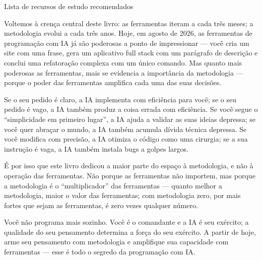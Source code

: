 \begin{center}\small\color{gray}Lista de recursos de estudo recomendados\end{center}


Voltemos à crença central deste livro: as ferramentas iteram a cada três meses; a metodologia evolui a cada três anos. Hoje, em agosto de 2026, as ferramentas de programação com IA já são poderosas a ponto de impressionar — você cria um site com uma frase, gera um aplicativo full stack com um parágrafo de descrição e conclui uma refatoração complexa com um único comando. Mas quanto mais poderosas as ferramentas, mais se evidencia a importância da metodologia — porque o poder das ferramentas amplifica cada uma das suas decisões.

Se o seu pedido é claro, a IA implementa com eficiência para você; se o seu pedido é vago, a IA também produz a coisa errada com eficiência. Se você segue o “simplicidade em primeiro lugar”, a IA ajuda a validar as suas ideias depressa; se você quer abraçar o mundo, a IA também acumula dívida técnica depressa. Se você modifica com precisão, a IA otimiza o código como uma cirurgia; se a sua instrução é vaga, a IA também instala bugs a golpes largos.

É por isso que este livro dedicou a maior parte do espaço à metodologia, e não à operação das ferramentas. Não porque as ferramentas não importem, mas porque a metodologia é o “multiplicador” das ferramentas — quanto melhor a metodologia, maior o valor das ferramentas; com metodologia zero, por mais fortes que sejam as ferramentas, é zero vezes qualquer número.

Você não programa mais sozinho. Você é o comandante e a IA é seu exército; a qualidade do seu pensamento determina a força do seu exército. A partir de hoje, arme seu pensamento com metodologia e amplifique sua capacidade com ferramentas — esse é todo o segredo da programação com IA.


